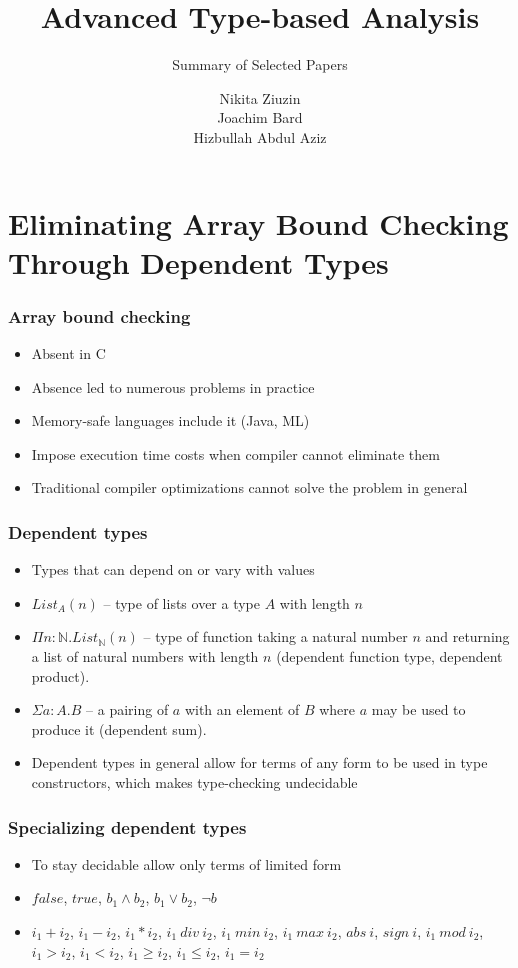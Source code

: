 \documentclass[pdf]{beamer}
\title{Advanced Type-based Analysis}
\subtitle{Summary of Selected Papers}
\author[Nikita Ziuzin, Joachim Bard, Hizbullah Abdul Aziz]{Nikita Ziuzin\\
        Joachim Bard\\
        Hizbullah Abdul Aziz}
\begin{document}
\begin{frame}
  \titlepage
\end{frame}

\section{Eliminating Array Bound Checking Through Dependent Types}

\begin{frame}
  \frametitle{Array bound checking}

  \begin{itemize}
    \item Absent in C
    \item Absence led to numerous problems in practice
    \item Memory-safe languages include it (Java, ML)
    \item Impose execution time costs when compiler cannot eliminate them
    \item Traditional compiler optimizations cannot solve the problem in general
  \end{itemize}
\end{frame}

\begin{frame}
  \frametitle{Dependent types}

  \begin{itemize}
    \item Types that can depend on or vary with values
    \item $\mathit{List_A}(n)$ -- type of lists over a type $A$ with length $n$
    \item $\Pi n : \mathbb{N}.List_\mathbb{N}(n)$ -- type of function taking a
      natural number $n$ and returning a list of natural numbers with length
      $n$ (dependent function type, dependent product).
    \item $\Sigma a : A. B$ -- a pairing of $a$ with an element of $B$ where $a$
      may be used to produce it (dependent sum).
    \item Dependent types in general allow for terms of any form to be used in
      type constructors, which makes type-checking undecidable
  \end{itemize}
\end{frame}

\begin{frame}
  \frametitle{Specializing dependent types}

  \begin{itemize}
    \item To stay decidable allow only terms of limited form
    \item $false$, $true$, $b_1 \land b_2$, $b_1 \lor b_2$, $\neg b$
    \item $i_1 + i_2$, $i_1 - i_2$, $i_1 * i_2$, $i_1~div~i_2$, $i_1~min~i_2$,
      $i_1~max~i_2$, $abs~i$, $sign~i$, $i_1~mod~i_2$, $i_1 > i_2$, $i_1 <
      i_2$, $i_1 \ge i_2$, $i_1 \le i_2$, $i_1 = i_2$
  \end{itemize}
\end{frame}
\end{document}
